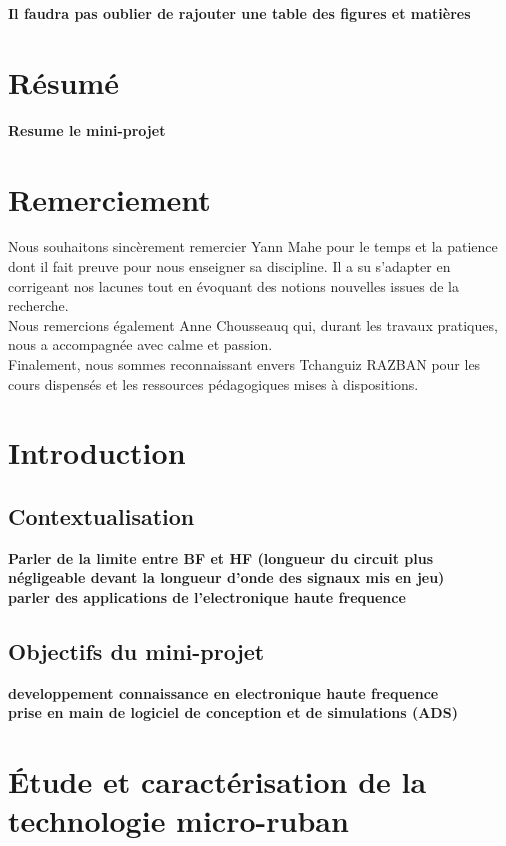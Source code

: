 \documentclass[french]{article}
\begin{document}
\newpage
\pagestyle{plain} %

\textbf{Il faudra pas oublier de rajouter une table des figures et matières}

\section{Résumé}
\textbf{Resume le mini-projet}

\section{Remerciement}
Nous souhaitons sincèrement remercier Yann Mahe pour le temps et la patience dont il fait preuve pour nous enseigner sa discipline. Il a su s'adapter en corrigeant nos lacunes tout en évoquant des notions nouvelles issues de la recherche. \\

Nous remercions également Anne Chousseauq qui, durant les travaux pratiques, nous a accompagnée avec calme et passion.\\

Finalement, nous sommes reconnaissant envers Tchanguiz RAZBAN pour les cours dispensés et les ressources pédagogiques mises à dispositions.

\section{Introduction}
\subsection{Contextualisation}
\textbf{Parler de la limite entre BF et HF (longueur du circuit plus négligeable devant la longueur d'onde des signaux mis en jeu)\\
parler des applications de l'electronique haute frequence}
\subsection{Objectifs du mini-projet}
\textbf{developpement connaissance en electronique haute frequence\\
prise en main de logiciel de conception et de simulations (ADS)}

\newpage

\section{Étude et caractérisation de la technologie micro-ruban}
\end{document}
